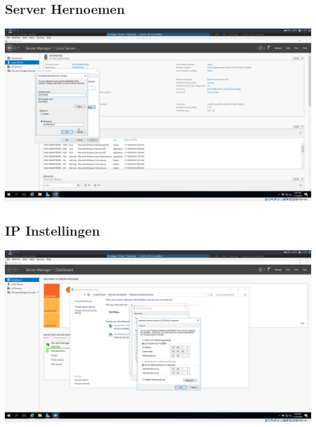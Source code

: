 \documentclass[a4paper]{article}
\begin{document}
\subsection{Server Hernoemen}
\begin{center}
	\includegraphics[width=15cm]{Pictures/Exchange/1542621993.png}
\end{center}
\subsection{IP Instellingen}
\begin{center}
	\includegraphics[width=15cm]{Pictures/Exchange/1542622148.png}
\end{center}
\end{document}
